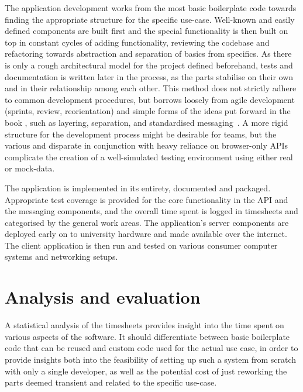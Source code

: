 The application development works from the most basic boilerplate code towards finding the appropriate structure for the specific use-case.
Well-known and easily defined components are built first and the special functionality is then built on top in constant cycles of adding functionality, reviewing the codebase and refactoring towards abstraction and separation of basics from specifics.
As there is only a rough architectural model for the project defined beforehand, tests and documentation is written later in the process, as the parts stabilise on their own and in their relationship among each other.
This method does not strictly adhere to common development procedures, but borrows loosely from agile development (sprints, review, reorientation) and simple forms of the ideas put forward in the book , such as layering, separation, and standardised messaging~\parencite{patternOrientedSoftwareArchitecture}.
A more rigid structure for the development process might be desirable for teams, but the various and disparate  in conjunction with heavy reliance on browser-only \ac{API}s complicate the creation of a well-simulated testing environment using either real or mock-data.

The application is implemented in its entirety, documented and packaged.
Appropriate test coverage is provided for the core functionality in the API and the messaging components, and the overall time spent is logged in timesheets and categorised by the general work areas.
The application's server components are deployed early on to university hardware and made available over the internet.
The client application is then run and tested on various consumer computer systems and networking setups.


\section{Analysis and evaluation}
\label{sec:analysis-evaluation}

A statistical analysis of the timesheets provides insight into the time spent on various aspects of the software.
It should differentiate between basic boilerplate code that can be reused and custom code used for the actual use case, in order to provide insights both into the feasibility of setting up such a system from scratch with only a single developer, as well as the potential cost of just reworking the parts deemed transient and related to the specific use-case.


